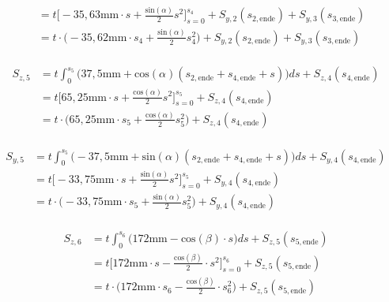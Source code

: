 \begin{itemize}
\begin{equation}
\begin{split}
	&= t\bigg[-35,63\mathrm{mm}\cdot s + \frac{\mathrm{sin}(\alpha)}{2}s^2\bigg]_{s=0}^{s_4} + S_{y,2}(s_{2,\mathrm{ende}})  + S_{y,3}(s_{3,\mathrm{ende}})\\\
	&= t\cdot\bigg(-35,62\mathrm{mm}\cdot s_4 + \frac{\mathrm{sin}(\alpha)}{2}s^2_4\bigg) + S_{y,2}(s_{2,\mathrm{ende}})  + S_{y,3}(s_{3,\mathrm{ende}})
\end{split}
\end{equation}\\
\begin{equation}
	\begin{split}
		S_{z,5} &= t\int_{0}^{s_5}\bigg(37,5\mathrm{mm}+\mathrm{cos}(\alpha)(s_{2,\mathrm{ende}}+s_{4,\mathrm{ende}}+s)\bigg)ds + S_{z,4}(s_{4,\mathrm{ende}})\\\
		&= t\bigg[65,25\mathrm{mm}\cdot s +\frac{\mathrm{cos}(\alpha)}{2}s^2\bigg]_{s=0}^{s_5} + S_{z,4}(s_{4,\mathrm{ende}})\\\
		&= t\cdot\bigg(65,25\mathrm{mm}\cdot s_5 +\frac{\mathrm{cos}(\alpha)}{2}s^2_5\bigg) + S_{z,4}(s_{4,\mathrm{ende}})
	\end{split}
\end{equation}\\
\begin{equation}
	\begin{split}
		S_{y,5} &= t\int_{0}^{s_5}\bigg(-37,5\mathrm{mm}+\mathrm{sin}(\alpha)(s_{2,\mathrm{ende}}+s_{4,\mathrm{ende}}+s)\bigg)ds + S_{y,4}(s_{4,\mathrm{ende}})\\\
		&= t\bigg[-33,75\mathrm{mm}\cdot s +\frac{\mathrm{sin}(\alpha)}{2}s^2\bigg]_{s=0}^{s_5} + S_{y,4}(s_{4,\mathrm{ende}})\\\
		&= t\cdot\bigg(-33,75\mathrm{mm}\cdot s_5 +\frac{\mathrm{sin}(\alpha)}{2}s^2_5\bigg) + S_{y,4}(s_{4,\mathrm{ende}})
	\end{split}
\end{equation}\\
\begin{equation}
	\begin{split}
		S_{z,6} &= t\int_{0}^{s_6}\bigg(172\mathrm{mm}-\mathrm{cos}(\beta)\cdot s\bigg)ds + S_{z,5}(s_{5,\mathrm{ende}})\\\
		&= t\bigg[172\mathrm{mm}\cdot s-\frac{\mathrm{cos}(\beta)}{2}\cdot s^2\bigg]_{s=0}^{s_6} + S_{z,5}(s_{5,\mathrm{ende}})\\\
		&= t\cdot\bigg(172\mathrm{mm}\cdot s_6-\frac{\mathrm{cos}(\beta)}{2}\cdot s^2_6\bigg) + S_{z,5}(s_{5,\mathrm{ende}})
	\end{split}
\end{equation}\\

\end{itemize}
